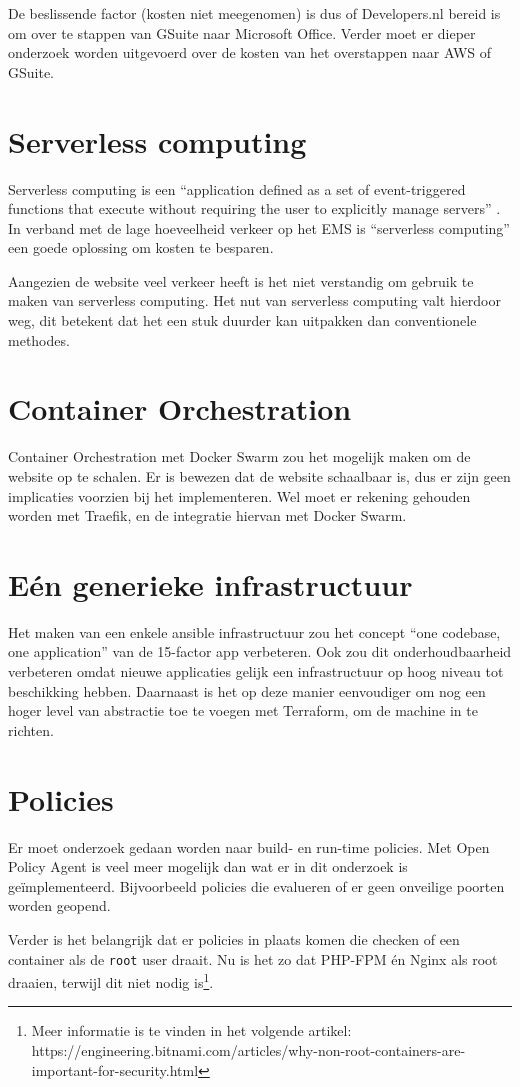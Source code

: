 De beslissende factor (kosten niet meegenomen) is dus of Developers.nl bereid is om over te stappen van GSuite naar Microsoft Office. Verder moet er dieper onderzoek worden uitgevoerd over de kosten van het overstappen naar AWS of GSuite.

\section{Serverless computing}
Serverless computing is een \enquote{application defined as a set of event-triggered functions that execute without requiring the user to explicitly manage servers} \parencite{ServerlessComputing}. In verband met de lage hoeveelheid verkeer op het EMS is \enquote{serverless computing} een goede oplossing om kosten te besparen.

Aangezien de website veel verkeer heeft is het niet verstandig om gebruik te maken van serverless computing. Het nut van serverless computing valt hierdoor weg, dit betekent dat het een stuk duurder kan uitpakken dan conventionele methodes.

\section{Container Orchestration}
Container Orchestration met Docker Swarm zou het mogelijk maken om de website op te schalen. Er is bewezen dat de website schaalbaar is, dus er zijn geen implicaties voorzien bij het implementeren. Wel moet er rekening gehouden worden met Traefik, en de integratie hiervan met Docker Swarm.

\section{Eén generieke infrastructuur}
Het maken van een enkele ansible infrastructuur zou het concept \enquote{one codebase, one application} van de 15-factor app verbeteren. Ook zou dit onderhoudbaarheid verbeteren omdat nieuwe applicaties gelijk een infrastructuur op hoog niveau tot beschikking hebben. Daarnaast is het op deze manier eenvoudiger om nog een hoger level van abstractie toe te voegen met Terraform, om de machine in te richten.

\section{Policies}
Er moet onderzoek gedaan worden naar build- en run-time policies. Met Open Policy Agent is veel meer mogelijk dan wat er in dit onderzoek is geïmplementeerd. Bijvoorbeeld policies die evalueren of er geen onveilige poorten worden geopend.

Verder is het belangrijk dat er policies in plaats komen die checken of een container als de \texttt{root} user draait. Nu is het zo dat PHP-FPM én Nginx als root draaien, terwijl dit niet nodig is\footnote{Meer informatie is te vinden in het volgende artikel:\\ https://engineering.bitnami.com/articles/why-non-root-containers-are-important-for-security.html}.